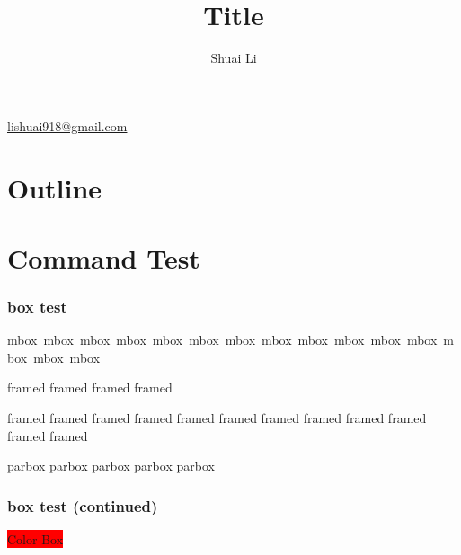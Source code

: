 \documentclass{beamer}
\title[Title on the footer]{Title}
\author{Shuai Li}
\date{}
\begin{document}
\begin{frame}[plain]
  \vspace{5mm}
  \begin{TitleBox}
    {
    \begin{center}
      {\LARGE \inserttitle}\linebreak
      \vspace{5mm}

      {\large \insertauthor}\linebreak
      \insertinstitute\linebreak
      \insertdate\linebreak
    \end{center}
    \begin{flushright}
      {\footnotesize
        \href{mailto: lishuai918@gmail.com}{{\faEnvelope}  lishuai918@gmail.com}
      }
    \end{flushright}
  }
  \end{TitleBox}
\end{frame}

\section*{Outline}
\frame{\tableofcontents[pausesections]}


\section{Command Test}

\begin{frame}
  \frametitle{box test}
  \mbox{mbox mbox mbox mbox mbox mbox mbox mbox mbox mbox mbox mbox mbox mbox mbox }
  \begin{framed}
    framed framed framed framed
  \end{framed}
  \begin{framed}
    framed framed framed framed framed framed framed framed framed framed framed framed
  \end{framed}
  \parbox{0.5\textwidth}{parbox parbox parbox parbox parbox }
\end{frame}

\begin{frame}
  \frametitle{box test (continued)}
  \colorbox{red}{Color Box}
\end{frame}
\end{document}
